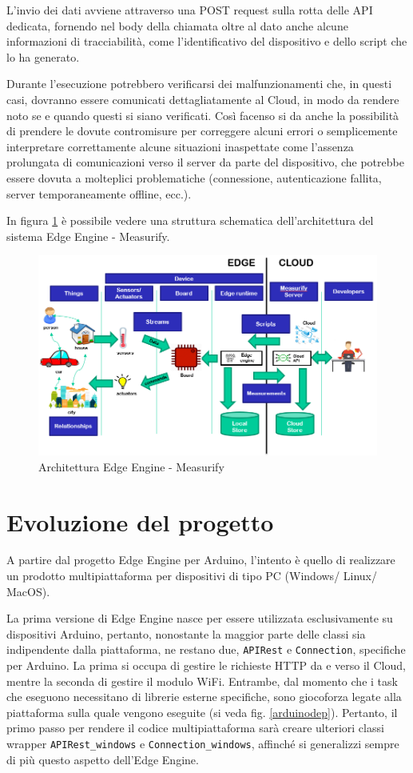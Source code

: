 L'invio dei dati avviene attraverso una POST request sulla rotta delle API dedicata, fornendo nel body della chiamata oltre al dato anche alcune informazioni di tracciabilità, come l'identificativo del dispositivo e dello script che lo ha generato.

Durante l’esecuzione potrebbero verificarsi dei malfunzionamenti che, in questi casi, dovranno essere comunicati dettagliatamente al Cloud, in modo da rendere noto se e quando questi si siano verificati. Così facenso si da anche la possibilità di prendere le dovute contromisure per correggere alcuni errori o semplicemente interpretare correttamente alcune situazioni inaspettate come l'assenza prolungata di comunicazioni verso il server da parte del dispositivo, che potrebbe essere dovuta a molteplici problematiche (connessione, autenticazione fallita, server temporaneamente offline, ecc.).

In figura \ref{edgecloud} è possibile vedere una struttura schematica dell'architettura del sistema Edge Engine - Measurify.

\begin{figure}[H]
	\centering
	\includegraphics[width=\linewidth]{pics/edgearch}
	\caption{Architettura Edge Engine - Measurify}
	\label{edgecloud}
\end{figure}

\section{Evoluzione del progetto}
A partire dal progetto Edge Engine per Arduino, l’intento è quello di realizzare un prodotto multipiattaforma per dispositivi di tipo PC (Windows/ Linux/ MacOS).

La prima versione di Edge Engine nasce per essere utilizzata esclusivamente su dispositivi Arduino, pertanto, nonostante la maggior parte delle classi sia indipendente dalla piattaforma, ne restano due, \texttt{APIRest} e \texttt{Connection}, specifiche per Arduino. La prima si occupa di gestire le richieste HTTP da e verso il Cloud, mentre la seconda di gestire il modulo WiFi. Entrambe, dal momento che i task che eseguono necessitano di librerie esterne specifiche, sono giocoforza legate alla piattaforma sulla quale vengono eseguite (si veda fig. \ref{arduinodep}). Pertanto, il primo passo per rendere il codice multipiattaforma sarà creare ulteriori classi wrapper \texttt{APIRest\_windows} e \texttt{Connection\_windows}, affinché si generalizzi sempre di più questo aspetto dell'Edge Engine.

